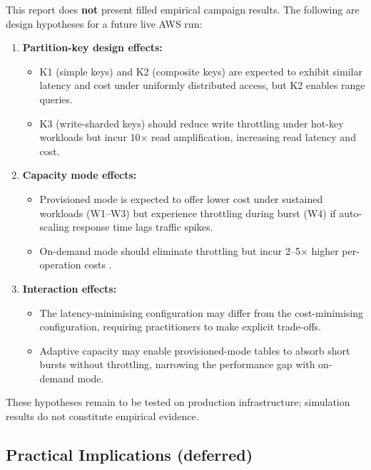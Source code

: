 This report does \textbf{not} present filled empirical campaign results. The following are design hypotheses for a future live AWS run:

\begin{enumerate}
    \item \textbf{Partition-key design effects:}
    \begin{itemize}
        \item K1 (simple keys) and K2 (composite keys) are expected to exhibit similar latency and cost under uniformly distributed access, but K2 enables range queries.
        \item K3 (write-sharded keys) should reduce write throttling under hot-key workloads but incur 10× read amplification, increasing read latency and cost.
    \end{itemize}
    
    \item \textbf{Capacity mode effects:}
    \begin{itemize}
        \item Provisioned mode is expected to offer lower cost under sustained workloads (W1–W3) but experience throttling during burst (W4) if auto-scaling response time lags traffic spikes.
        \item On-demand mode should eliminate throttling but incur 2–5× higher per-operation costs \citep{haubenschild2025oltp}.
    \end{itemize}
    
    \item \textbf{Interaction effects:}
    \begin{itemize}
        \item The latency-minimising configuration may differ from the cost-minimising configuration, requiring practitioners to make explicit trade-offs.
        \item Adaptive capacity \citep{aws2025adaptive} may enable provisioned-mode tables to absorb short bursts without throttling, narrowing the performance gap with on-demand mode.
    \end{itemize}
\end{enumerate}

These hypotheses remain to be tested on production infrastructure; simulation results do not constitute empirical evidence.

\subsection{Practical Implications (deferred)}

